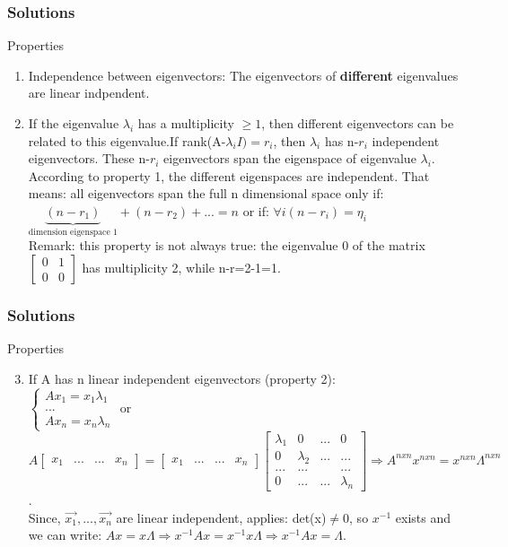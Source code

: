 \begin{frame}
	\frametitle{Solutions}
	\begin{block}{Properties}
		\begin{enumerate}
			\item Independence  between eigenvectors: The eigenvectors of \textbf{different} eigenvalues are linear indpendent. 
			\item If the eigenvalue $\lambda_i$ has a multiplicity $\geq 1$, then different eigenvectors can be related to this eigenvalue.If rank(A-$\lambda_i I)=r_i$, then $\lambda_i$ has n-$r_i$ independent eigenvectors. These n-$r_i$ eigenvectors span the eigenspace of eigenvalue $\lambda_i$.\\
			According to property 1, the different eigenspaces are independent. That means: all eigenvectors span the full n dimensional space only if:\\ $\underbrace{(n-r_1)}_\text{dimension eigenspace 1}+(n-r_2)+...=n$ or if: $\forall i (n-r_i)=\eta_i$\\
			Remark: this property is not always true: the eigenvalue 0 of the matrix $\begin{bmatrix}
			0 & 1\\0 & 0
			\end{bmatrix}$ has multiplicity 2, while n-r=2-1=1.
		\end{enumerate}
	\end{block}
\end{frame}

\begin{frame}
	\frametitle{Solutions}
	\begin{block}{Properties}
		\begin{enumerate}
			\setcounter{enumi}{2}
			\item If A  has n linear independent eigenvectors (property 2):\\
				$\begin{cases} Ax_1=x_1\lambda_1\\...\\Ax_n=x_n\lambda_n \end{cases}$ or $A\begin{bmatrix}
				x_1 & ... &...& x_n
				\end{bmatrix}=\begin{bmatrix}
				x_1 & ...&... & x_n
				\end{bmatrix}\begin{bmatrix}
				\lambda_1 & 0 &...& 0\\
				0&\lambda_2 & ... & ...\\
				...& ... & &...\\
				0&...&...&\lambda_n
				\end{bmatrix} \Rightarrow A^{nxn}x^{nxn}=x^{nxn}\Lambda^{nxn}$. \\
				Since, $\overrightarrow{x_1},...,\overrightarrow{x_n}$ are linear independent, applies: det(x)$\neq$0, so $x^{-1}$ exists and we can write: $Ax=x\Lambda \Rightarrow x^{-1} Ax=x^{-1}x\Lambda \Rightarrow x^{-1} Ax=\Lambda$.
		\end{enumerate}
	\end{block}
\end{frame}

